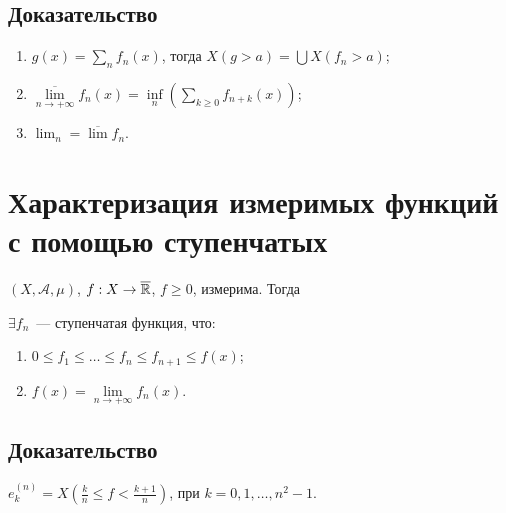 \documentclass{article}
\begin{document}
        \subsection{Доказательство}
        
            \begin{enumerate}
            
                \item $g(x) = \sum\limits_n f_n(x)$, тогда $X(g > a) = \bigcup X (f_n > a)$;
                
                \item $\overline{\lim\limits_{n \rightarrow +\infty}} f_n(x) = \inf\limits_n \left( \sum\limits_{k \geqslant 0} f_{n + k}(x) \right)$;
                
                \item $\lim _n = \overline{\lim} f_n$.
                
            \end{enumerate}
            
    \newpage
    
    \section{Характеризация измеримых функций с помощью ступенчатых}
    
        $(X, \mathcal{A}, \mu )$, $f : X \rightarrow \overline{\mathbb{R}}$, $f \geqslant 0$, измерима. Тогда
        
        $\exists f_n$~--- ступенчатая функция, что:
        
        \begin{enumerate}
        
            \item $0 \leqslant f_1 \leqslant \ldots \leqslant f_n \leqslant f_{n + 1} \leqslant f(x)$;
            
            \item $f(x) = \lim\limits_{n \rightarrow +\infty} f_n(x)$.
            
        \end{enumerate}
        
        \subsection{Доказательство}
        
            $e^{(n)}_k = X \left( \frac{k}{n} \leqslant f < \frac{k + 1}{n} \right)$, при $k = 0, 1, \ldots, n^2 - 1$.
            
\end{document}

